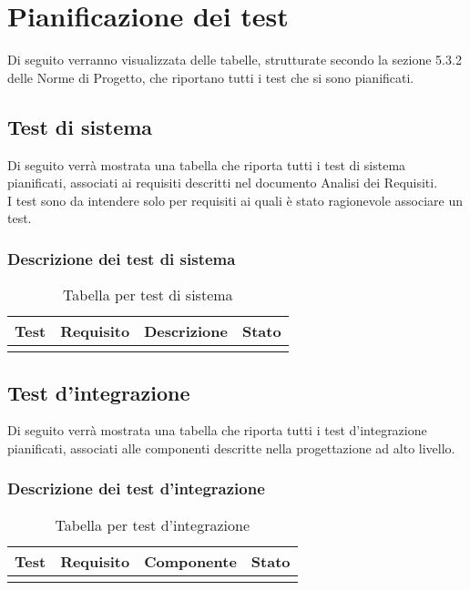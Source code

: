 \newpage
\section{Pianificazione dei test}
Di seguito verranno visualizzata delle tabelle, strutturate secondo la sezione 5.3.2 delle Norme di Progetto, che riportano tutti i test che si sono pianificati. \\
\subsection{Test di sistema}
Di seguito verrà mostrata una tabella che riporta tutti i test di sistema pianificati, associati ai requisiti descritti nel documento Analisi dei Requisiti.\\
I test sono da intendere solo per requisiti ai quali è stato ragionevole associare un test.
\subsubsection{Descrizione dei test di sistema}
\begin{center}
\begin{longtable}{|c|c|c|c|}
\toprule
\textbf{Test} & \textbf{Requisito} & \textbf{Descrizione} & \textbf{Stato}\\
\bottomrule
\caption{Tabella per test di sistema}
\label{tab:changelog}
\end{longtable}
\end{center}
\subsection{Test d'integrazione}
Di seguito verrà mostrata una tabella che riporta tutti i test d'integrazione pianificati, associati alle componenti descritte nella progettazione ad alto livello.\\
\subsubsection{Descrizione dei test d'integrazione}
\begin{center}
\begin{longtable}{|c|c|c|c|}
\toprule
\textbf{Test} & \textbf{Requisito} & \textbf{Componente} & \textbf{Stato}\\
\bottomrule
\caption{Tabella per test d'integrazione}
\label{tab:changelog}
\end{longtable}
\end{center}
